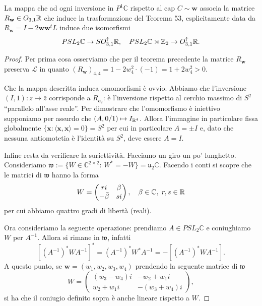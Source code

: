 \begin{teorema}
	La mappa che ad ogni inversione in $P^{1}\mathbb C$ rispetto al cap $C\sim \mathbf w$ associa la matrice $R_{\mathbf w}\in O_{3,1}\mathbb{R}$ che induce la trasformazione del Teorema 53, esplicitamente data da $R_{\mathbf w} = I-2\mathbf w\mathbf w^{t}L$ induce due isomorfismi
	$$PSL_{2}\mathbb C\to SO_{3,1}^{\uparrow}\mathbb{R},\quad PSL_{2}\mathbb C\rtimes\mathbb Z_{2}\to O_{3,1}^{\uparrow}\mathbb{R}.$$
\end{teorema}
\begin{proof}
	Per prima cosa osserviamo che per il teorema precedente la matrice $R_{\mathbf w}$ preserva $\mathcal L$ in quanto $(R_{\mathbf w})_{4,4} = 1-2w_{4}^{2}\cdot(-1) = 1+2w_{4}^{2}>0$.

	Che la mappa descritta induca omomorfismi è ovvio.
	Abbiamo che l'inversione $(I,1): z\mapsto \bar z$ corrisponde a $R_{\mathbf e_{2}}$: è l'inversione rispetto al cerchio massimo di $S^{2}$ ``parallelo all'asse reale''.
	Per dimostrare che l'omomorfismo è iniettivo supponiamo per assurdo che $(A,0/1)\mapsto I_{\mathbb{R}^{4}}$. Allora l'immagine in particolare fissa globalmente $\{\mathbf x:\langle\mathbf x,\mathbf x\rangle = 0\} = S^{2}$ per cui in particolare $A = \pm I$ e, dato che nessuna antiomotetia è l'identità su $S^{2}$, deve essere $A = I$.
	
	Infine resta da verificare la suriettività. 
	Facciamo un giro un po' lunghetto. Consideriamo $\mathfrak w := \{W\in \mathbb C^{2\times 2}:\, W^{*} = -W\} = \mathfrak u_{2}\mathbb C$. Facendo i conti si scopre che le matrici di $\mathfrak w$ hanno la forma
	$$
	W = \begin{pmatrix}
	ri & \beta\\
	-\bar\beta & si
	\end{pmatrix},
	\quad \beta\in\mathbb C,\; r,s\in\mathbb{R}$$
	per cui abbiamo quattro gradi di libertà (reali).
	
	Ora consideriamo la seguente operazione: prendiamo $A\in PSL_{2}\mathbb C$ e coniughiamo $W$ per $A^{-1}$. Allora si rimane in $\mathfrak w$, infatti 
	$$[(A^{-1})^{*}WA^{-1}]^{*} = (A^{-1})^{*}W^{*}A^{-1} = -[(A^{-1})^{*}WA^{-1}].$$
	A questo punto, se $\mathbf w = (w_{1}, w_{2}, w_{3}, w_{4})$ prendendo la seguente matrice di $\mathfrak w$  
	$$
	W = \begin{pmatrix}
	(w_{3} - w_{4})i & -w_{2} + w_{1}i\\
	w_{2} + w_{1}i & -(w_{3} + w_{4})i
	\end{pmatrix},$$
	si ha che il coniugio definito sopra è anche lineare rispetto a $W$.
	

\end{proof}
